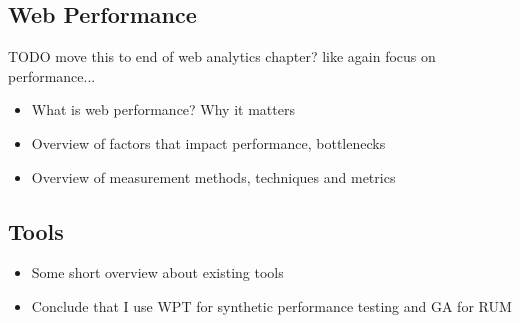 












\subsection{Web Performance}
TODO move this to end of web analytics chapter? like again focus on performance...
\begin{itemize}
\item What is web performance? Why it matters
\item Overview of factors that impact performance, bottlenecks
\item Overview of measurement methods, techniques and metrics
\end{itemize}







\subsection{Tools}


\begin{itemize}
\item Some short overview about existing tools
\item Conclude that I use WPT for synthetic performance testing and GA for RUM
\end{itemize}









